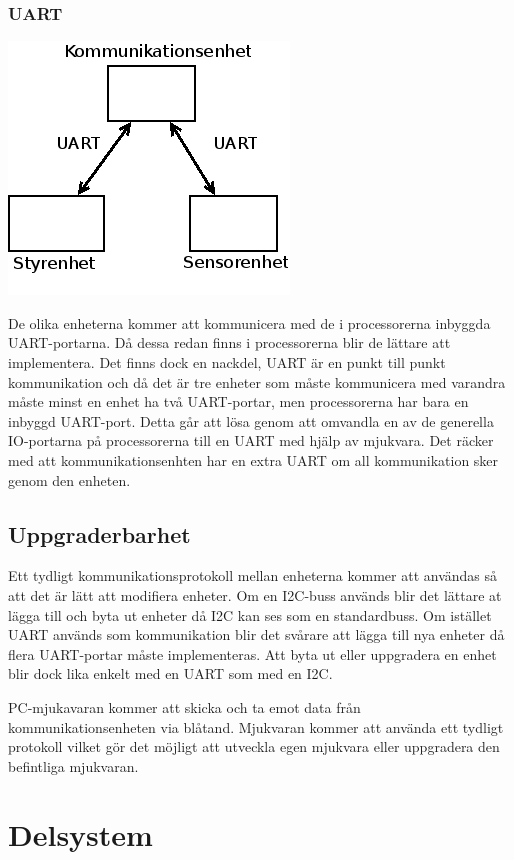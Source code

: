 \documentclass[a4paper,12pt]{article}
\begin{document}
\subsubsection{UART}
\begin{center}
\includegraphics[scale=0.7]{delsystem_uart.png}
\end{center}
De olika enheterna kommer att kommunicera med de i processorerna inbyggda UART-portarna. 
Då dessa redan finns i processorerna blir de lättare att implementera. Det finns dock en nackdel, UART är en 
punkt till punkt kommunikation och då det är tre enheter som måste kommunicera med varandra måste minst en enhet
ha två UART-portar, men processorerna har bara en inbyggd UART-port. Detta går att lösa genom att omvandla en av de generella 
IO-portarna på processorerna till en UART med hjälp av mjukvara. 
Det räcker med att kommunikationsenhten har en extra UART om all kommunikation sker genom den enheten.

\subsection{Uppgraderbarhet}
Ett tydligt kommunikationsprotokoll mellan enheterna kommer att användas så att det är lätt att modifiera enheter.
Om en I2C-buss används blir det lättare at lägga till och byta ut enheter då I2C kan ses som en standardbuss.
Om istället UART används som kommunikation blir det svårare att lägga till nya enheter då flera UART-portar måste implementeras.
Att byta ut eller uppgradera en enhet blir dock lika enkelt med en UART som med en I2C.

PC-mjukavaran kommer att skicka och ta emot data från kommunikationsenheten via blåtand.
Mjukvaran kommer att använda ett tydligt protokoll vilket gör det möjligt att utveckla egen mjukvara eller uppgradera den befintliga mjukvaran.
\section{Delsystem}
\end{document}
